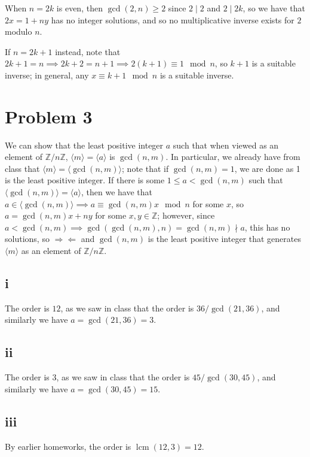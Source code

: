 \documentclass[12pt,letterpaper]{article}
\theoremstyle{definition}
\newcommand{\contra}{\Rightarrow\!\Leftarrow}
\newcommand{\Z}{\mathbb{Z}}
\DeclareMathOperator{\lcm}{lcm}
\begin{document}
When $n = 2k$ is even, then $\gcd(2, n) \geq 2$ since $2 \mid 2$ and $2 \mid 2k$, so we have that $2x = 1 + ny$ has no integer solutions, and so no multiplicative inverse exists for $2$ modulo $n$.

If $n = 2k + 1$ instead, note that $2k + 1 = n \implies 2k + 2 = n + 1 \implies 2(k + 1) \equiv 1 \mod n$, so $k + 1$ is a suitable inverse; in general, any $x \equiv k  +1 \mod n$ is a suitable inverse.

\section*{Problem 3}

We can show that the least positive integer $a$ such that when viewed as an element of $\Z/n\Z$, $\langle m \rangle = \langle a \rangle$ is $\gcd(n, m)$. In particular, we already have from class that $\langle m \rangle = \langle \gcd(n,m) \rangle$; note that if $\gcd(n,m) = 1$, we are done as 1 is the least positive integer. If there is some $1 \leq a < \gcd(n,m)$ such that $\langle \gcd(n,m) \rangle = \langle a \rangle$, then we have that $a \in \langle \gcd(n,m) \rangle \implies a \equiv \gcd(n,m)x \mod n$ for some $x$, so $a = \gcd(n,m)x + ny$ for some $x, y \in \Z$; however, since $a < \gcd(n,m) \implies \gcd(\gcd(n,m), n) = \gcd(n,m) \nmid a$, this has no solutions, so $\contra$ and $\gcd(n,m)$ is the least positive integer that generates $\langle m \rangle$ as an element of $\Z/n\Z$.

\subsection*{i}

The order is $12$, as we saw in class that the order is $36 / \gcd(21, 36)$, and similarly we have $a = \gcd(21,36) = 3$.

\subsection*{ii}

The order is $3$, as we saw in class that the order is $45 / \gcd(30, 45)$, and similarly we have $a = \gcd(30,45) = 15$.

\subsection*{iii}

By earlier homeworks, the order is $\lcm(12,3) = 12$.
\end{document}
